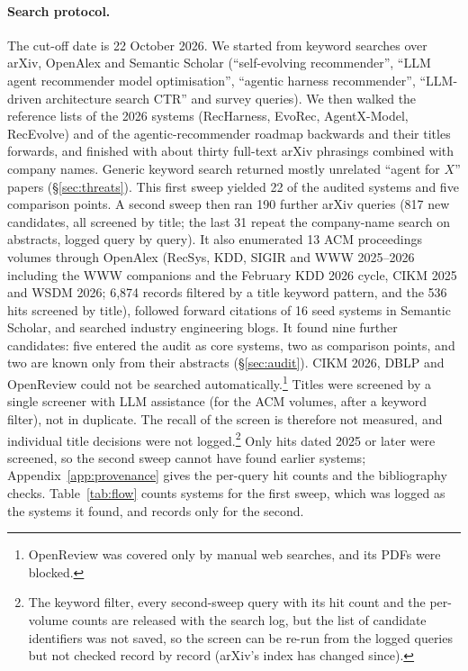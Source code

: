 \documentclass[sigconf,nonacm]{acmart}
\begin{document}
\paragraph{Search protocol.} The cut-off date is 22 October 2026. We started from keyword searches over arXiv,
OpenAlex and Semantic Scholar (``self-evolving recommender'', ``LLM agent recommender model optimisation'', ``agentic
harness recommender'', ``LLM-driven architecture search CTR'' and survey queries). We then walked the reference lists of
the 2026 systems (RecHarness, EvoRec, AgentX-Model, RecEvolve) and of the agentic-recommender roadmap backwards and
their titles forwards, and finished with about thirty full-text arXiv phrasings combined with company names. Generic
keyword search returned mostly unrelated ``agent for $X$'' papers (\S\ref{sec:threats}). This first sweep yielded 22 of the audited systems
and five comparison points. A second sweep then ran 190 further arXiv queries (817 new candidates, all screened by
title; the last 31 repeat the company-name search on abstracts, logged query by query). It also enumerated 13 ACM proceedings volumes through OpenAlex (RecSys, KDD, SIGIR and WWW 2025--2026 including the
WWW companions and the February KDD 2026 cycle, CIKM 2025 and WSDM 2026; 6{,}874 records filtered by a title keyword pattern, and the 536 hits screened by title), followed
forward citations of 16 seed systems in Semantic Scholar, and searched industry engineering blogs. It found nine
further candidates: five entered the audit as core systems, two as comparison points, and two are known only from
their abstracts (\S\ref{sec:audit}). CIKM 2026, DBLP and OpenReview could not be searched
automatically.\footnote{OpenReview was covered only by manual web searches, and its PDFs were blocked.} Titles were screened by a single screener with LLM assistance (for the ACM volumes, after a keyword filter), not in
duplicate. The recall of the screen is therefore not measured, and individual title decisions were not logged.\footnote{The keyword filter, every second-sweep query with its hit
count and the per-volume counts are released with the search log, but the list of candidate identifiers was not saved, so the screen can be re-run from the logged queries but not checked record by record (arXiv's index has changed since).}
Only hits dated 2025 or later were screened, so the second sweep cannot have found earlier systems; Appendix~\ref{app:provenance} gives the per-query hit counts and the bibliography checks. Table~\ref{tab:flow} counts systems for the first sweep, which was logged as the systems it found, and records only for the second.
\end{document}
